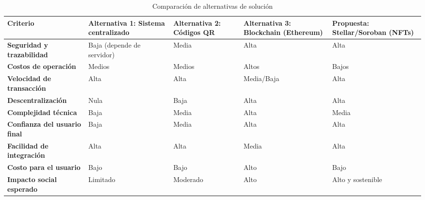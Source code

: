 \documentclass[12pt,a4paper]{article}
\begin{document}
\begin{table}[H]
\centering
\small
\renewcommand{\arraystretch}{1.25}
\setlength{\tabcolsep}{4pt}

\begin{tabularx}{\textwidth}{|p{3.2cm}|X|X|X|X|}
\hline
\textbf{Criterio} &
\textbf{Alternativa 1: Sistema centralizado} &
\textbf{Alternativa 2: Códigos QR} &
\textbf{Alternativa 3: Blockchain (Ethereum)} &
\textbf{Propuesta: Stellar/Soroban (NFTs)} \\
\hline

\textbf{Seguridad y trazabilidad} & Baja (depende de servidor) & Media & Alta & Alta \\ \hline
\textbf{Costos de operación} & Medios & Medios & Altos & Bajos \\ \hline
\textbf{Velocidad de transacción} & Alta & Alta & Media/Baja & Alta \\ \hline
\textbf{Descentralización} & Nula & Baja & Alta & Alta \\ \hline
\textbf{Complejidad técnica} & Baja & Media & Alta & Media \\ \hline
\textbf{Confianza del usuario final} & Baja & Media & Alta & Alta \\ \hline
\textbf{Facilidad de integración} & Alta & Alta & Media & Alta \\ \hline
\textbf{Costo para el usuario} & Bajo & Bajo & Alto & Bajo \\ \hline
\textbf{Impacto social esperado} & Limitado & Moderado & Alto & Alto y sostenible \\ \hline

\end{tabularx}

\caption{Comparación de alternativas de solución}
\label{tab:comparacion_alternativas}
\end{table}

\clearpage
\end{document}
